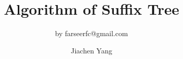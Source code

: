 \usepackage[sort&compress]{natbib}
\usepackage{tikz} 
\usepackage{mathptmx}
\usepackage{marvosym}
\usepackage[T1]{fontenc}
\usepackage{color}
\usepackage{amsmath}
\usepackage{amssymb}
\usepackage{tipa}


\usepackage{listings}
\usepackage{clrscode}




\usepackage[english]{babel}


\graphicspath{{figure/}}



\newcommand{\br}[0]{\par\vskip15pt\par}




\title[SuffixTree]{Algorithm of Suffix Tree}

\subtitle{by farseerfc@gmail.com}

\author[jc-yang]{
	Jiachen Yang 
}




\frame{\maketitle}




